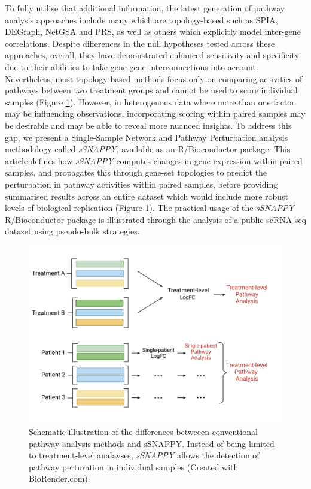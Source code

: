 \documentclass[9pt,a4paper,]{extarticle}
\begin{document}
To fully utilise that additional information, the latest generation of pathway analysis approaches include many which are topology-based such as SPIA\citep{Tarca2009}, DEGraph\citep{Jacob2012}, NetGSA\citep{Ma2016} and PRS\citep{Ibrahim2012}, as well as others which explicitly model inter-gene correlations\citep{Wu2012}.
Despite differences in the null hypotheses tested across these approaches, overall, they have demonstrated enhanced sensitivity and specificity due to their abilities to take gene-gene interconnections into account\citep{Nguyen2019-va, Ma2019}.
Nevertheless, most topology-based methods focus only on comparing activities of pathways between two treatment groups and cannot be used to score individual samples (Figure \ref{fig:Figure1}).
However, in heterogenous data where more than one factor may be influencing observations\citep{Hanzelmann2013}, incorporating scoring within paired samples may be desirable and may be able to reveal more nuanced insights.
To address this gap, we present a Single-Sample Network and Pathway Perturbation analysis methodology called \href{https://bioconductor.org/packages/sSNAPPY}{\emph{sSNAPPY}}, available as an R/Bioconductor package.
This article defines how \emph{sSNAPPY} computes changes in gene expression within paired samples, and propagates this through gene-set topologies to predict the perturbation in pathway activities within paired samples, before providing summarised results across an entire dataset which would include more robust levels of biological replication (Figure \ref{fig:Figure1}).
The practical usage of the \emph{sSNAPPY} R/Bioconductor package is illustrated through the analysis of a public scRNA-seq dataset using pseudo-bulk strategies.

\begin{figure}

{\centering \includegraphics[width=1\linewidth]{sSNAPPY_paper_files/figure-latex/Figure1} 

}

\caption{Schematic illustration of the differences betweeen conventional pathway analysis methods and sSNAPPY. Instead of being limited to treatment-level analayses, \textit{sSNAPPY} allows the detection of pathway perturation in individual samples (Created with BioRender.com).}\label{fig:Figure1}
\end{figure}
\end{document}
